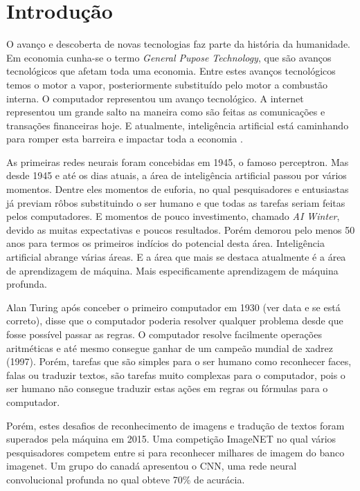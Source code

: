 \chapter{Introdução}
\label{cap:introducao}

O avanço e descoberta de novas tecnologias faz parte da história da humanidade. Em economia cunha-se o termo \textit{General Pupose Technology}, que são avanços tecnológicos que afetam toda uma economia. Entre estes avanços tecnológicos temos o motor a vapor, posteriormente substituído pelo motor a combustão interna. O computador representou um avanço tecnológico. A internet representou um grande salto na maneira como são feitas as comunicações e transações financeiras hoje. E atualmente, inteligência artificial está caminhando para romper esta barreira e impactar toda a economia .

As primeiras redes neurais foram concebidas em 1945, o famoso perceptron. Mas desde 1945 e até os dias atuais, a área de inteligência artificial passou por vários momentos. Dentre eles momentos de euforia, no qual pesquisadores e entusiastas já previam rôbos substituindo o ser humano e que todas as tarefas seriam feitas pelos computadores. E momentos de pouco investimento, chamado \textit{AI Winter}, devido as muitas expectativas e poucos resultados. Porém demorou pelo menos 50 anos para termos os primeiros indícios do potencial desta área. Inteligência artificial abrange várias áreas. E a área que mais se destaca atualmente é a área de aprendizagem de máquina. Mais especificamente aprendizagem de máquina profunda. 

Alan Turing após conceber o primeiro computador em 1930 (ver data e se está correto), disse que o computador poderia resolver qualquer problema desde que fosse possível passar as regras. O computador resolve facilmente operações aritméticas e até mesmo consegue ganhar de um campeão mundial de xadrez (1997). Porém, tarefas que são simples para o ser humano como reconhecer faces, falas ou traduzir textos, são tarefas muito complexas para o computador, pois o ser humano não consegue traduzir estas ações em regras ou fórmulas para o computador. 

Porém, estes desafios de reconhecimento de imagens e tradução de textos foram superados pela máquina em 2015. Uma competição ImageNET no qual vários pesquisadores competem entre si para reconhecer milhares de imagem do banco imagenet. Um grupo do canadá apresentou o CNN, uma rede neural convolucional profunda no qual obteve 70\% de acurácia.

